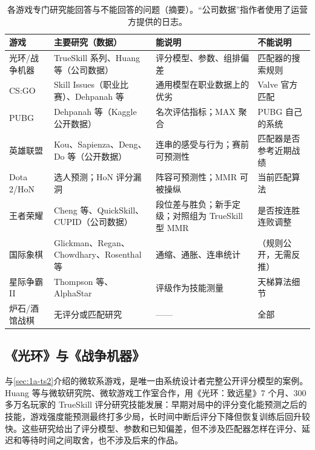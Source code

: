 \begin{table}[tbp]
  \centering\footnotesize
  \caption{各游戏专门研究能回答与不能回答的问题（摘要）。“公司数据”指作者使用了运营方提供的日志。}
  \label{tab:1a-games}
  \begin{tabularx}{\linewidth}{>{\raggedright\arraybackslash}p{2.0cm}>{\raggedright\arraybackslash}p{3.3cm}>{\raggedright\arraybackslash}X>{\raggedright\arraybackslash}X}
    \toprule
    游戏 & 主要研究（数据） & 能说明 & 不能说明 \\
    \midrule
    光环/战争机器 & TrueSkill 系列、Huang 等（公司数据） & 评分模型、参数、组排偏差 & 匹配器的搜索规则 \\
    CS:GO & Skill Issues（职业比赛）、Dehpanah 等 & 通用模型在职业数据上的优劣 & Valve 官方匹配 \\
    PUBG & Dehpanah 等（Kaggle 公开数据） & 名次评估指标；MAX 聚合 & PUBG 自己的系统 \\
    英雄联盟 & Kou、Sapienza、Deng、Do 等（公开数据） & 连串的感受与行为；赛前可预测性 & 匹配器是否参考近期战绩 \\
    Dota 2/HoN & 选人预测；HoN 评分漏洞 & 阵容可预测性；MMR 可被操纵 & 当前匹配算法 \\
    王者荣耀 & Cheng 等、QuickSkill、CUPID（公司数据） & 段位差与胜负；新手定级；对照组为 TrueSkill 型 MMR & 是否按连胜连败调整 \\
    国际象棋 & Glickman、Regan、Chowdhary、Rosenthal 等 & 通缩、通胀、连串统计 & （规则公开，无需反推） \\
    星际争霸 II & Thompson 等、AlphaStar & 评级作为技能测量 & 天梯算法细节 \\
    炉石/酒馆战棋 & 无评分或匹配研究 & —— & 全部 \\
    \bottomrule
  \end{tabularx}
\end{table}

\subsection{《光环》与《战争机器》}\label{sec:1a-games-halo}

与\cref{sec:1a-ts2}介绍的微软系游戏，是唯一由系统设计者完整公开评分模型的案例\cite{herbrich2006trueskill,minka2018trueskill}\tagLit。Huang 等与微软研究院、微软游戏工作室合作，用《光环：致远星》7 个月、300 多万名玩家的 TrueSkill 评分研究技能发展：早期对局中的评分变化能预测之后的技能，游戏强度能预测最终打多少局，长时间中断后评分下降但恢复训练后回升较快\cite{huang2013mastering}\tagLit。这些研究给出了评分模型、参数和已知偏差，但不涉及匹配器怎样在评分、延迟和等待时间之间取舍，也不涉及后来的作品。

